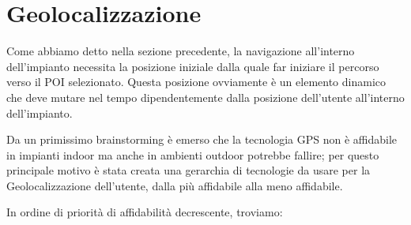 \begin{figure}[htp]
\end{figure}


\section{Geolocalizzazione}
Come abbiamo detto nella sezione precedente, la navigazione all'interno dell'impianto necessita la posizione iniziale
dalla quale far iniziare il percorso verso il POI selezionato.
Questa posizione ovviamente è un elemento dinamico che deve mutare nel tempo dipendentemente dalla posizione
dell'utente all'interno dell'impianto.

Da un primissimo brainstorming è emerso che la tecnologia GPS non è affidabile in impianti indoor ma anche in ambienti
outdoor potrebbe fallire; per questo principale motivo è stata creata una gerarchia di tecnologie da usare per
la Geolocalizzazione dell'utente, dalla più affidabile alla meno affidabile.

In ordine di priorità di affidabilità decrescente, troviamo:

